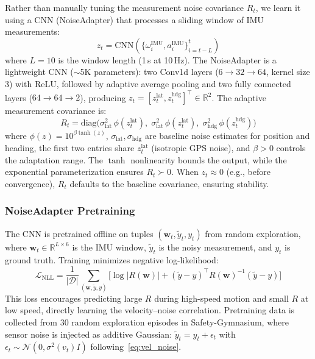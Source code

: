 \documentclass[letterpaper, 10 pt, conference]{ieeeconf}
\begin{document}
Rather than manually tuning the measurement noise covariance $R_t$, we learn it using a CNN (NoiseAdapter) that processes a sliding window of IMU measurements:
\begin{equation}
    z_t = \text{CNN}\left(\{\omega^{\text{IMU}}_i, a^{\text{IMU}}_i\}_{i=t-L}^{t}\right)
    \label{eq:noise_cnn}
\end{equation}
where $L{=}10$ is the window length (1\,s at 10\,Hz). The NoiseAdapter is a lightweight CNN (${\sim}$5K parameters): two Conv1d layers ($6{\to}32{\to}64$, kernel size 3) with ReLU, followed by adaptive average pooling and two fully connected layers ($64{\to}64{\to}2$), producing $z_t = [z^{\text{lat}}_t, z^{\text{hdg}}_t]^\top \in \mathbb{R}^2$. The adaptive measurement covariance is:
\begin{equation}
    R_{t} = \text{diag}\!\Big(\sigma^2_{\text{lat}}\,\phi(z^{\text{lat}}_t),\;\sigma^2_{\text{lat}}\,\phi(z^{\text{lat}}_t),\;\sigma^2_{\text{hdg}}\,\phi(z^{\text{hdg}}_t)\Big)
    \label{eq:learned_R}
\end{equation}
where $\phi(z) = 10^{\beta \tanh(z)}$, $\sigma_{\text{lat}}, \sigma_{\text{hdg}}$ are baseline noise estimates for position and heading, the first two entries share $z^{\text{lat}}_t$ (isotropic GPS noise), and $\beta > 0$ controls the adaptation range. The $\tanh$ nonlinearity bounds the output, while the exponential parameterization ensures $R_t \succ 0$. When $z_t \approx 0$ (e.g., before convergence), $R_t$ defaults to the baseline covariance, ensuring stability.

\subsubsection{NoiseAdapter Pretraining}

The CNN is pretrained offline on tuples $(\mathbf{w}_t, \tilde{y}_t, y_t)$ from random exploration, where $\mathbf{w}_t \in \mathbb{R}^{L \times 6}$ is the IMU window, $\tilde{y}_t$ is the noisy measurement, and $y_t$ is ground truth. Training minimizes negative log-likelihood:
\begin{equation}
    \mathcal{L}_{\text{NLL}} \!=\! \frac{1}{|\mathcal{D}|} \!\sum_{(\mathbf{w}, \tilde{y}, y)}\! \Big[ \log |R(\mathbf{w})| + (\tilde{y} {-} y)^\top R(\mathbf{w})^{-1} (\tilde{y} {-} y) \Big]
    \label{eq:nll_loss}
\end{equation}
This loss encourages predicting large $R$ during high-speed motion and small $R$ at low speed, directly learning the velocity--noise correlation. Pretraining data is collected from 30 random exploration episodes in Safety-Gymnasium, where sensor noise is injected as additive Gaussian: $\tilde{y}_t = y_t + \epsilon_t$ with $\epsilon_t \sim \mathcal{N}(0, \sigma^2(v_t)I)$ following~\eqref{eq:vel_noise}.
\end{document}
